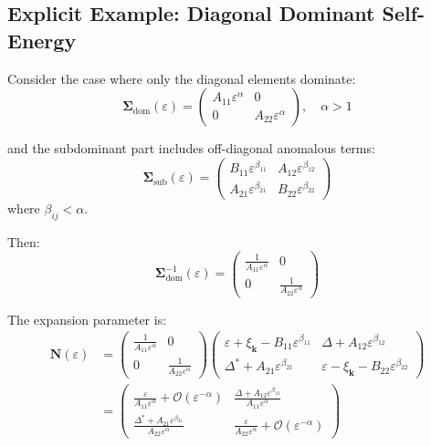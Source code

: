 \documentclass[12pt]{article}
\begin{document}
\subsection{Explicit Example: Diagonal Dominant Self-Energy}

Consider the case where only the diagonal elements dominate:
\begin{equation}
\mathbf{\Sigma}_{\text{dom}}(\varepsilon) = \begin{pmatrix}
A_{11} \varepsilon^\alpha & 0 \\
0 & A_{22} \varepsilon^\alpha
\end{pmatrix}, \quad \alpha > 1
\end{equation}

and the subdominant part includes off-diagonal anomalous terms:
\begin{equation}
\mathbf{\Sigma}_{\text{sub}}(\varepsilon) = \begin{pmatrix}
B_{11} \varepsilon^{\beta_{11}} & A_{12} \varepsilon^{\beta_{12}} \\
A_{21} \varepsilon^{\beta_{21}} & B_{22} \varepsilon^{\beta_{22}}
\end{pmatrix}
\end{equation}
where $\beta_{ij} < \alpha$.

Then:
\begin{equation}
\mathbf{\Sigma}_{\text{dom}}^{-1}(\varepsilon) = \begin{pmatrix}
\frac{1}{A_{11} \varepsilon^\alpha} & 0 \\
0 & \frac{1}{A_{22} \varepsilon^\alpha}
\end{pmatrix}
\end{equation}

The expansion parameter is:
\begin{align}
\mathbf{N}(\varepsilon) &= \begin{pmatrix}
\frac{1}{A_{11} \varepsilon^\alpha} & 0 \\
0 & \frac{1}{A_{22} \varepsilon^\alpha}
\end{pmatrix} \begin{pmatrix}
\varepsilon + \xi_{\mathbf{k}} - B_{11}\varepsilon^{\beta_{11}} & \Delta + A_{12}\varepsilon^{\beta_{12}} \\
\Delta^* + A_{21}\varepsilon^{\beta_{21}} & \varepsilon - \xi_{\mathbf{k}} - B_{22}\varepsilon^{\beta_{22}}
\end{pmatrix} \\
&= \begin{pmatrix}
\frac{\varepsilon}{A_{11}\varepsilon^\alpha} + \mathcal{O}(\varepsilon^{-\alpha}) & \frac{\Delta + A_{12}\varepsilon^{\beta_{12}}}{A_{11}\varepsilon^\alpha} \\
\frac{\Delta^* + A_{21}\varepsilon^{\beta_{21}}}{A_{22}\varepsilon^\alpha} & \frac{\varepsilon}{A_{22}\varepsilon^\alpha} + \mathcal{O}(\varepsilon^{-\alpha})
\end{pmatrix}
\end{align}
\end{document}
